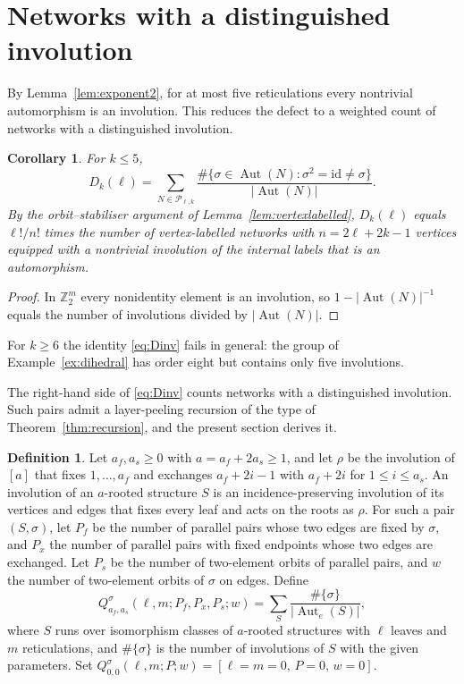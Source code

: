 \documentclass[11pt,a4paper]{article}
\newtheorem{corollary}[theorem]{Corollary}
\theoremstyle{definition}
\newtheorem{definition}[theorem]{Definition}
\newcommand{\Aut}{\operatorname{Aut}}
\newcommand{\cP}{\mathcal{P}}
\begin{document}
\section{Networks with a distinguished involution}\label{sec:symrec}

By Lemma~\ref{lem:exponent2}, for at most five reticulations every nontrivial automorphism is an involution. This reduces the defect to a weighted count of networks with a distinguished involution.

\begin{corollary}\label{cor:Dinv}
For $k\le5$,
\begin{equation}\label{eq:Dinv}
D_k(\ell)=\sum_{N\in\cP_{\ell,k}}\frac{\#\{\sigma\in\Aut(N):\sigma^2=\mathrm{id}\ne\sigma\}}{|\Aut(N)|}.
\end{equation}
By the orbit--stabiliser argument of Lemma~\ref{lem:vertexlabelled}, $D_k(\ell)$ equals $\ell!/n!$ times the number of vertex-labelled networks with $n=2\ell+2k-1$ vertices equipped with a nontrivial involution of the internal labels that is an automorphism.
\end{corollary}

\begin{proof}
In $\mathbb{Z}_2^m$ every nonidentity element is an involution, so $1-|\Aut(N)|^{-1}$ equals the number of involutions divided by $|\Aut(N)|$.
\end{proof}

For $k\ge6$ the identity \eqref{eq:Dinv} fails in general: the group of Example~\ref{ex:dihedral} has order eight but contains only five involutions.

The right-hand side of \eqref{eq:Dinv} counts networks with a distinguished involution. Such pairs admit a layer-peeling recursion of the type of Theorem~\ref{thm:recursion}, and the present section derives it.

\begin{definition}\label{def:invstruct}
Let $a_f,a_s\ge0$ with $a=a_f+2a_s\ge1$, and let $\rho$ be the involution of $[a]$ that fixes $1,\dots,a_f$ and exchanges $a_f+2i-1$ with $a_f+2i$ for $1\le i\le a_s$. An involution of an $a$-rooted structure $S$ is an incidence-preserving involution of its vertices and edges that fixes every leaf and acts on the roots as $\rho$. For such a pair $(S,\sigma)$, let $P_f$ be the number of parallel pairs whose two edges are fixed by $\sigma$, and $P_x$ the number of parallel pairs with fixed endpoints whose two edges are exchanged. Let $P_s$ be the number of two-element orbits of parallel pairs, and $w$ the number of two-element orbits of $\sigma$ on edges. Define
\[
Q^\sigma_{a_f,a_s}(\ell,m;P_f,P_x,P_s;w)=\sum_{S}\frac{\#\{\sigma\}}{|\Aut_e(S)|},
\]
where $S$ runs over isomorphism classes of $a$-rooted structures with $\ell$ leaves and $m$ reticulations, and $\#\{\sigma\}$ is the number of involutions of $S$ with the given parameters. Set $Q^\sigma_{0,0}(\ell,m;P;w)=[\ell=m=0,\,P=0,\,w=0]$.
\end{definition}
\end{document}
